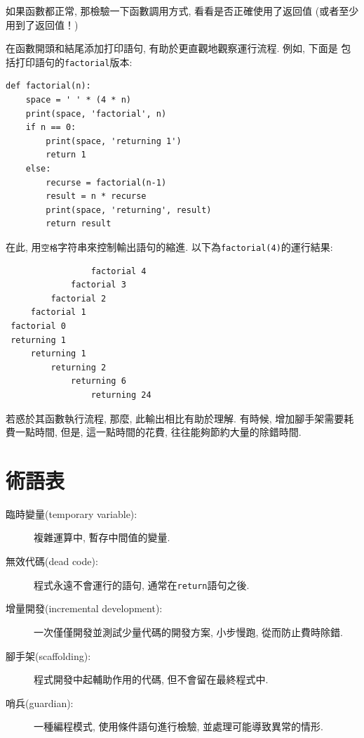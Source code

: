 \documentclass[10pt]{book}
\begin{document}
如果函數都正常, 那檢驗一下函數調用方式, 看看是否正確使用了返回值
(或者至少用到了返回值！)

在函數開頭和結尾添加打印語句, 有助於更直觀地觀察運行流程. 例如, 下面是
包括打印語句的{\tt factorial}版本:

\begin{verbatim}
def factorial(n):
    space = ' ' * (4 * n)
    print(space, 'factorial', n)
    if n == 0:
        print(space, 'returning 1')
        return 1
    else:
        recurse = factorial(n-1)
        result = n * recurse
        print(space, 'returning', result)
        return result
\end{verbatim}
%
在此, 用{\tt 空格}字符串來控制輸出語句的縮進. 以下為{\tt factorial(4)}的運行結果:

\begin{verbatim}
                 factorial 4
             factorial 3
         factorial 2
     factorial 1
 factorial 0
 returning 1
     returning 1
         returning 2
             returning 6
                 returning 24
\end{verbatim}
%
若惑於其函數執行流程, 那麼, 此輸出相比有助於理解. 
有時候, 增加腳手架需要耗費一點時間, 
但是, 這一點時間的花費, 往往能夠節約大量的除錯時間. 

\section{術語表}

\begin{description}

\item[臨時變量(temporary variable):] 複雜運算中, 暫存中間值的變量. 

\item[無效代碼(dead code):]  程式永遠不會運行的語句, 通常在{\tt return}語句之後. 

\item[增量開發(incremental development):]  一次僅僅開發並測試少量代碼的開發方案, 
小步慢跑, 從而防止費時除錯. 

\item[腳手架(scaffolding):]  程式開發中起輔助作用的代碼, 但不會留在最終程式中. 

\item[哨兵(guardian):]  一種編程模式, 使用條件語句進行檢驗, 並處理可能導致異常的情形. 

\end{description}
\end{document}
